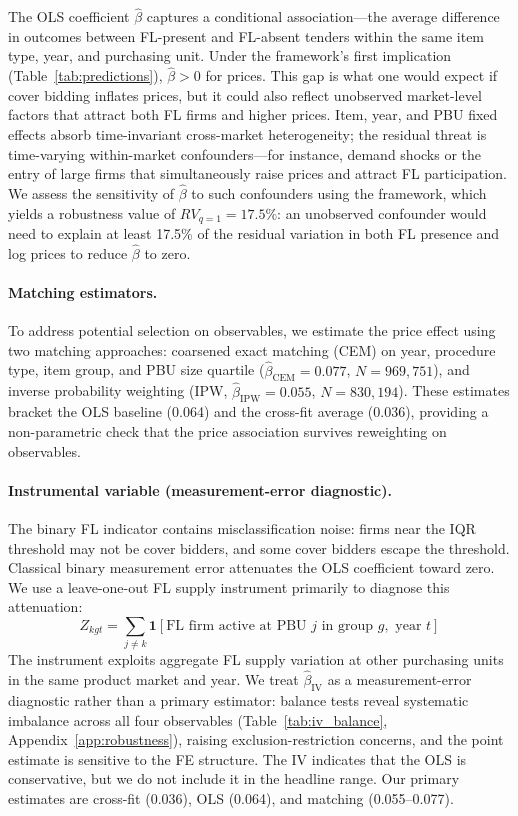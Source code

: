 The OLS coefficient $\hat{\beta}$ captures a conditional
association---the average difference in outcomes between FL-present and
FL-absent tenders within the same item type, year, and purchasing unit.
Under the framework's first implication (Table~\ref{tab:predictions}), $\hat{\beta} > 0$ for prices.
This gap is what one would expect if cover bidding inflates prices, but
it could also reflect unobserved market-level factors that attract both
FL firms and higher prices. Item, year, and PBU fixed effects absorb
time-invariant cross-market heterogeneity; the residual threat is time-varying within-market confounders---for
instance, demand shocks or the entry of large firms that
simultaneously raise prices and attract FL participation. We assess the sensitivity of
$\hat{\beta}$ to such confounders using the \citet{cinelli2020making}
framework, which yields a robustness value of $RV_{q=1} = 17.5\%$: an
unobserved confounder would need to explain at least 17.5\% of the
residual variation in both FL presence and log prices to reduce
$\hat{\beta}$ to zero.

\paragraph{Matching estimators.}
To address potential selection on observables, we estimate the
price effect using two matching approaches: coarsened exact
matching (CEM) on year, procedure type, item group, and PBU size
quartile ($\hat{\beta}_{\text{CEM}} = 0.077$, $N = 969{,}751$), and
inverse probability weighting (IPW, $\hat{\beta}_{\text{IPW}} = 0.055$,
$N = 830{,}194$). These estimates bracket the OLS baseline (0.064)
and the cross-fit average (0.036), providing a non-parametric check
that the price association survives reweighting on observables.

\paragraph{Instrumental variable (measurement-error diagnostic).}
The binary FL indicator contains misclassification noise: firms near
the IQR threshold may not be cover bidders, and some cover bidders
escape the threshold. Classical binary measurement error attenuates
the OLS coefficient toward zero. We use a leave-one-out FL supply
instrument primarily to diagnose this attenuation:
\begin{equation}
  Z_{kgt} = \sum_{j \neq k} \mathbf{1}[\text{FL firm active at PBU } j
  \text{ in group } g, \text{ year } t]
  \label{eq:iv_v6}
\end{equation}
The instrument exploits aggregate FL supply variation at other
purchasing units in the same product market and year. We treat
$\hat{\beta}_{\text{IV}}$ as a measurement-error diagnostic rather
than a primary estimator: balance tests reveal systematic imbalance
across all four observables (Table~\ref{tab:iv_balance},
Appendix~\ref{app:robustness}), raising exclusion-restriction
concerns, and the point estimate is sensitive to the FE structure. The IV
indicates that the OLS is conservative, but we do not include it in
the headline range. Our primary estimates are cross-fit (0.036),
OLS (0.064), and matching (0.055--0.077).

